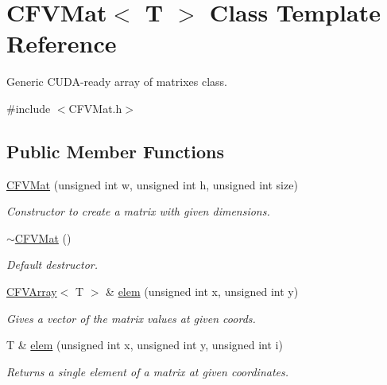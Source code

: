\hypertarget{classFVL_1_1CFVMat}{
\section{CFVMat$<$ T $>$ Class Template Reference}
\label{d9/dcb/classFVL_1_1CFVMat}
}


Generic CUDA-\/ready array of matrixes class.  




{\ttfamily \#include $<$CFVMat.h$>$}

\subsection*{Public Member Functions}
\begin{DoxyCompactItemize}
\item 
\hyperlink{classFVL_1_1CFVMat_a90b5cd38bfc076884d1f3cacc9f35cee}{CFVMat} (unsigned int w, unsigned int h, unsigned int size)
\begin{DoxyCompactList}\small\item\em Constructor to create a matrix with given dimensions. \item\end{DoxyCompactList}\item 
\hyperlink{classFVL_1_1CFVMat_a9746a1a3f248769a1268c2a225cedd52}{$\sim$CFVMat} ()
\begin{DoxyCompactList}\small\item\em Default destructor. \item\end{DoxyCompactList}\item 
\hyperlink{classFVL_1_1CFVArray}{CFVArray}$<$ T $>$ \& \hyperlink{classFVL_1_1CFVMat_ab179d788531c0f2d2f17e75896112f63}{elem} (unsigned int x, unsigned int y)
\begin{DoxyCompactList}\small\item\em Gives a vector of the matrix values at given coords. \item\end{DoxyCompactList}\item 
T \& \hyperlink{classFVL_1_1CFVMat_a2d02be460deeb3ad73a4bf0a3f9beb4d}{elem} (unsigned int x, unsigned int y, unsigned int i)
\begin{DoxyCompactList}\small\item\em Returns a single element of a matrix at given coordinates. \item\end{DoxyCompactList}\item 

\end{DoxyCompactItemize}
